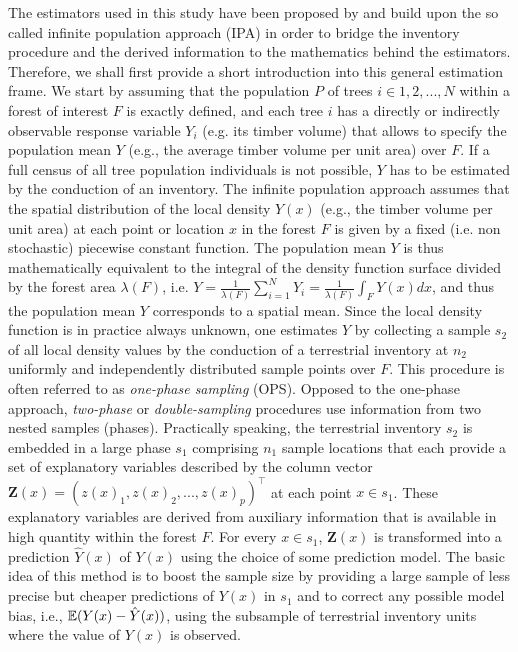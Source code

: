 The estimators used in this study have been proposed by \citep{mandallaz2013a,mandallaz2013b} and build upon the so called infinite population approach (IPA) in order to bridge the inventory procedure and the derived information to the mathematics behind the estimators. Therefore, we shall first provide a short introduction into this general estimation frame. We start by assuming that the population $P$ of trees $i \in 1,2, ..., N$ within a forest of interest $F$ is exactly defined, and each tree $i$ has a directly or indirectly observable response variable $Y_i$ (e.g. its timber volume) that allows to specify the population mean $Y$ (e.g., the average timber volume per unit area) over $F$. If a full census of all tree population individuals is not possible, $Y$ has to be estimated by the conduction of an inventory.  The infinite population approach assumes that the spatial distribution of the local density $Y(x)$ (e.g., the timber volume per unit area) at each point or location $x$ in the forest $F$ is given by a fixed (i.e. non stochastic) piecewise constant function. The population mean $Y$ is thus mathematically equivalent to the integral of the density function surface divided by the forest area $\lambda(F)$, i.e. $Y=\frac{1}{\lambda(F)} \sum_{i=1}^{N}Y_i=\frac{1}{\lambda(F)}\int_{F}Y(x)dx$, and thus the population mean $Y$ corresponds to a spatial mean. Since the local density function is in practice always unknown, one estimates $Y$ by collecting a sample $s_2$ of all local density values by the conduction of a terrestrial inventory at $n_2$ uniformly and independently distributed sample points over $F$. This procedure is often referred to as \textit{one-phase sampling} (OPS). Opposed to the one-phase approach, \textit{two-phase} or \textit{double-sampling} procedures use information from two nested samples (phases). Practically speaking, the terrestrial inventory $s_2$ is embedded in a large phase $s_1$ comprising $n_1$ sample locations that each provide a set of explanatory variables described by the column vector $\pmb{Z}(x)=(z(x)_1, z(x)_2,...,z(x)_p)^{\top}$ at each point $x \in s_1$. These explanatory variables are derived from auxiliary information that is available in high quantity within the forest $F$. For every $x \in s_1$, $\pmb{Z}(x)$ is transformed into a prediction $\hat{Y}(x)$ of $Y(x)$ using the choice of some prediction model. The basic idea of this method is to boost the sample size by providing a large sample of less precise but cheaper predictions of $Y(x)$ in $s_1$ and to correct any possible model bias, i.e., $\mathbb{E}{(Y(x)-\hat{Y}(x))}$, using the subsample of terrestrial inventory units where the value of $Y(x)$ is observed.

